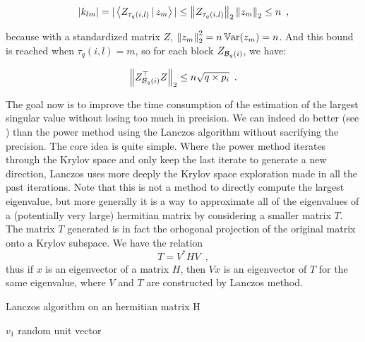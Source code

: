 \documentclass[a4]{article}
\begin{document}
\[|k_{lm}| = |\left\langle Z_{\tau_q(i,l)}\, |\,  z_m\right\rangle | \leq \left \lVert Z_{\tau_q(i,l)} \right \rVert_2 \left \lVert z_m \right \rVert_2 \leq n\enspace,\]

because with a standardized matrix $Z$, $\left \lVert z_m \right \rVert_2^2 = n \operatorname{\mathbb{V} ar}(z_m)=n$.
And this bound is reached when $\tau_q(i, l)=m$, so for each block $Z_{\mathcal{B}_{q}(i)}$, we have:

\[\left \lVert Z_{\mathcal{B}_{q}(i)}^\top Z \right \rVert_2 \leq n\sqrt{q\times p_i} \enspace.\]

The goal now is to improve the time consumption of the estimation of the largest singular value without losing too much in precision.
We can indeed do better (see ) than the power method using the Lanczos algorithm  without sacrifying the precision.
The core idea is quite simple. Where the power method iterates through the Krylov space and only keep the last iterate to generate a new direction, Lanczos uses more deeply the Krylov space exploration made in all the past iterations.
Note that this is not a method to directly compute the largest eigenvalue, but more generally it is a way to approximate all of the eigenvalues of a (potentially very large) hermitian matrix by considering a smaller matrix $T$.
The matrix $T$ generated is in fact the orhogonal projection of the original matrix onto a Krylov subspace.
We have the relation \[T = V^* H V\enspace,\]
thus if $x$ is an eigenvector of a matrix $H$, then $Vx$ is an eigenvector of $T$ for the same eigenvalue, where $V$ and $T$ are constructed by Lanczos method.
\medskip

\begin{algorithm}[H]
	\label{algo:Lanczos}
	\caption{Lanczos algorithm on an hermitian matrix H}

	$v_1$ random unit vector


\end{algorithm}
\end{document}

